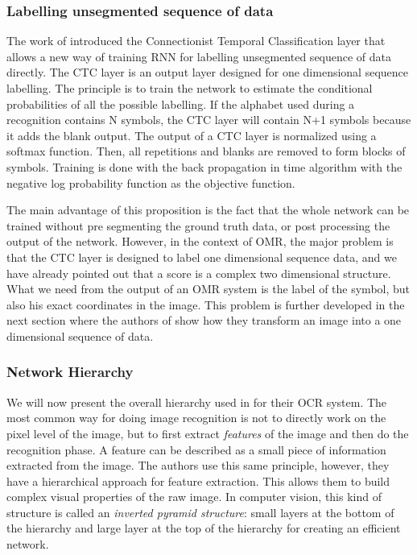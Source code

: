 \documentclass[11pt]{sdm}
\begin{document}
\subsubsection{Labelling unsegmented sequence of data}

The work of \cite{graves_connectionist_2006} introduced the Connectionist Temporal Classification layer that allows a new way of training RNN for labelling unsegmented sequence of data directly.
The CTC layer is an output layer designed for one dimensional sequence labelling.
The principle is to train the network to estimate the conditional probabilities of all the possible labelling.
If the alphabet used during a recognition contains N symbols, the CTC layer will contain N+1 symbols because it adds the blank output.
The output of a CTC layer is normalized using a softmax function.
Then, all repetitions and blanks are removed to form blocks of symbols.
Training is done with the back propagation in time algorithm with the negative log probability function as the objective function.

The main advantage of this proposition is the fact that the whole network can be trained without pre segmenting the ground truth data, or post processing the output of the network.
However, in the context of OMR, the major problem is that the CTC layer is designed to label one dimensional sequence data, and we have already pointed out that a score is a complex two dimensional structure.
What we need from the output of an OMR system is the label of the symbol, but also his exact coordinates in the image.
This problem is further developed in the next section where the authors of \cite{graves_offline_2009} show how they transform an image into a one dimensional sequence of data.

\subsubsection{Network Hierarchy}

We will now present the overall hierarchy used in \cite{graves_offline_2009} for their OCR system.
The most common way for doing image recognition is not to directly work on the pixel level of the image, but to first extract \textit{features} of the image and then do the recognition phase.
A feature can be described as a small piece of information extracted from the image.
The authors use this same principle, however, they have a hierarchical approach for feature extraction.
This allows them to build complex visual properties of the raw image.
In computer vision, this kind of structure is called an \textit{inverted pyramid structure}: small layers at the bottom of the hierarchy and large layer at the top of the hierarchy for creating an efficient network.
\end{document}
